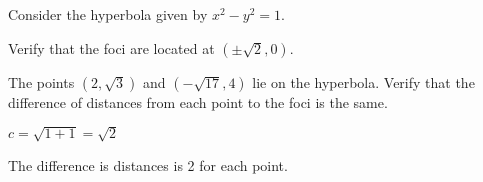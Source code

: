 {Consider the hyperbola given by $x^2-y^2=1$.
	\begin{enumext}
	\item		Verify that the foci are located at $(\pm \sqrt{2},0)$.
	\item		The points $(2,\sqrt{3})$ and $(-\sqrt{17},4)$ lie on the hyperbola. Verify that the difference of distances from each point to the foci is the same.
	\end{enumext}
}
{\begin{enumext}
\item		$c=\sqrt{1+1}=\sqrt{2}$
\item		The difference is distances is 2 for each point.
\end{enumext}
}
